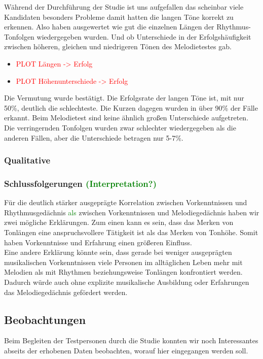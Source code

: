 \documentclass{acm_proc_article-sp}
\begin{document}
Während der Durchführung der Studie ist uns aufgefallen das scheinbar viele Kandidaten besonders Probleme damit hatten die langen Töne korrekt zu erkennen. Also haben ausgewertet wie gut die einzelnen Längen der Rhythmus-Tonfolgen wiedergegeben wurden. Und ob Unterschiede in der Erfolgshäufigkeit zwischen höheren, gleichen und niedrigeren Tönen des Melodietestes gab.
\begin{itemize} 
\item \textcolor{red}{PLOT Längen -> Erfolg}
\item \textcolor{red}{PLOT Höhenunterschiede -> Erfolg}
\end{itemize}
Die Vermutung wurde bestätigt. Die Erfolgsrate der langen Töne ist, mit nur 50\%, deutlich die schlechteste. Die Kurzen dagegen wurden in über 90\% der Fälle erkannt. Beim Melodietest sind keine ähnlich großen Unterschiede aufgetreten. Die verringernden Tonfolgen wurden zwar schlechter wiedergegeben als die anderen Fällen, aber die Unterschiede betragen nur 5-7\%.
\subsubsection{Qualitative}
\subsubsection{Schlussfolgerungen \textcolor{green}{(Interpretation?)}}
Für die deutlich stärker ausgeprägte Korrelation zwischen Vorkenntnissen und Rhythmusgedächnis \textcolor{green}{als} zwischen Vorkenntnissen und Melodiegedächnis haben wir zwei mögliche Erklärungen. Zum einen kann es sein, dass das Merken von Tonlängen eine anspruchsvollere Tätigkeit ist als das Merken von Tonhöhe. Somit haben Vorkenntnisse und Erfahrung einen größeren Einfluss. \\
Eine andere Erklärung könnte sein, dass gerade bei weniger ausgeprägten musikalischen Vorkenntnissen viele Personen im alltäglichen Leben mehr mit Melodien als mit Rhythmen beziehungsweise Tonlängen konfrontiert werden. Dadurch würde auch ohne explizite musikalische Ausbildung oder Erfahrungen das Melodiegedächnis gefördert werden.\\
\subsection{Beobachtungen}
Beim Begleiten der Testpersonen durch die Studie konnten wir noch Interessantes abseits der erhobenen Daten beobachten, worauf hier eingegangen werden soll.\\
\end{document}
